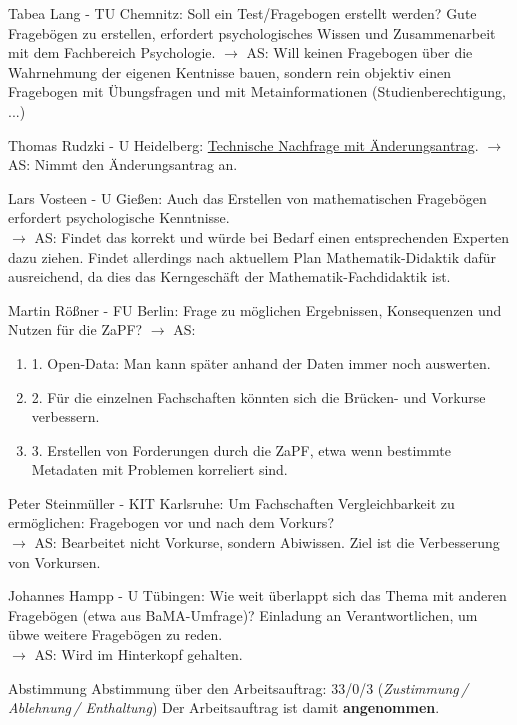     \begin{outline}
      \1 Tabea Lang - TU Chemnitz:  Soll ein Test/Fragebogen erstellt werden? Gute Fragebögen zu erstellen, erfordert psychologisches Wissen und Zusammenarbeit mit dem Fachbereich Psychologie. $\rightarrow$ AS: Will keinen Fragebogen über die Wahrnehmung der eigenen Kentnisse bauen, sondern rein objektiv einen Fragebogen mit Übungsfragen und mit Metainformationen (Studienberechtigung, ...)

      \1 Thomas Rudzki - U Heidelberg:  \uline{Technische Nachfrage mit Änderungs\-antrag}.
        $\rightarrow$ AS: Nimmt den Änderungsantrag an.

      \1 Lars Vosteen - U Gießen:  Auch das Erstellen von mathematischen Fragebögen erfordert psychologische Kenntnisse. \\
        $\rightarrow$ AS: Findet das korrekt und würde bei Bedarf einen entsprechenden Experten dazu ziehen. Findet allerdings nach aktuellem Plan Mathematik-Didaktik dafür ausreichend, da dies das Kerngeschäft der Mathematik-Fachdidaktik ist.

      \1 Martin Rößner - FU Berlin:  Frage zu möglichen Ergebnissen, Konsequenzen und Nutzen für die ZaPF? $\rightarrow$ AS:
        \begin{enumerate}
          \item 1. Open-Data: Man kann später anhand der Daten immer noch auswerten.
          \item 2. Für die einzelnen Fachschaften könnten sich die Brücken- und Vorkurse verbessern.
          \item 3. Erstellen von Forderungen durch die ZaPF, etwa wenn bestimmte Metadaten mit Problemen korreliert sind.
        \end{enumerate}

      \1 Peter Steinmüller - KIT Karlsruhe:  Um Fachschaften Vergleichbarkeit zu ermöglichen: Fragebogen vor und nach dem Vorkurs? \\
        $\rightarrow$ AS: Bearbeitet nicht Vorkurse, sondern Abiwissen. Ziel ist die Verbesserung von Vorkursen.

      \1 Johannes Hampp - U Tübingen:  Wie weit überlappt sich das Thema mit anderen Fragebögen (etwa aus BaMA-Umfrage)? Einladung an Verantwortlichen, um übwe weitere Fragebögen zu reden. \\
        $\rightarrow$ AS: Wird im Hinterkopf gehalten.
    \end{outline}

    \begin{success}{Abstimmung}
      Abstimmung über den Arbeitsauftrag: 33/0/3 (\textit{Zustimmung\,/ Ablehnung\,/ Enthaltung})
      Der Arbeitsauftrag ist damit \textbf{angenommen}.
    \end{success}


